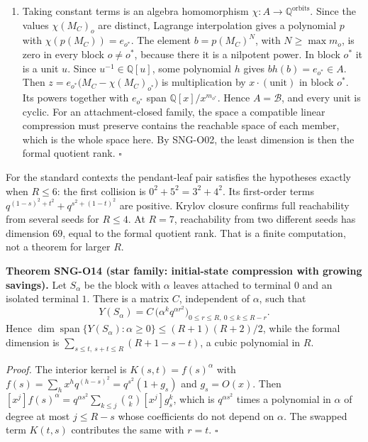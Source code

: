 \documentclass[
  11pt,
  a4paper,
]{report}
\providecommand{\tightlist}{%
  \setlength{\itemsep}{0pt}\setlength{\parskip}{0pt}}
\begin{document}
\begin{enumerate}
\def\labelenumi{(\arabic{enumi})}
\setcounter{enumi}{1}
\tightlist
\item
  Taking constant terms is an algebra homomorphism
  \(\chi:A\to\mathbb Q^{\text{orbits}}\). Since the values
  \(\chi(M_C)_o\) are distinct, Lagrange interpolation gives a
  polynomial \(p\) with \(\chi(p(M_C))=e_{o^*}\). The element
  \(b=p(M_C)^{N}\), with \(N\ge\max m_o\), is zero in every block
  \(o\ne o^*\), because there it is a nilpotent power. In block \(o^*\)
  it is a unit \(u\). Since \(u^{-1}\in\mathbb Q[u]\), some polynomial
  \(h\) gives \(bh(b)=e_{o^*}\in A\). Then
  \(z=e_{o^*}\bigl(M_C-\chi(M_C)_{o^*}\bigr)\) is multiplication by
  \(x\cdot(\text{unit})\) in block \(o^*\). Its powers together with
  \(e_{o^*}\) span \(\mathbb Q[x]/x^{m_{o^*}}\). Hence \(A=\mathcal B\),
  and every unit is cyclic. For an attachment-closed family, the space a
  compatible linear compression must preserve contains the reachable
  space of each member, which is the whole space here. By SNG-O02, the
  least dimension is then the formal quotient rank. \(\square\)
\end{enumerate}

For the standard contexts the pendant-leaf pair satisfies the hypotheses
exactly when \(R\le6\): the first collision is \(0^2+5^2=3^2+4^2\). Its
first-order terms \(q^{(1-s)^2+t^2}+q^{s^2+(1-t)^2}\) are positive.
Krylov closure confirms full reachability from several seeds for
\(R\le4\). At \(R=7\), reachability from two different seeds has
dimension \(69\), equal to the formal quotient rank. That is a finite
computation, not a theorem for larger \(R\).

\textbf{Theorem SNG-O14 (star family: initial-state compression with
growing savings).} Let \(S_\alpha\) be the block with \(\alpha\) leaves
attached to terminal \(0\) and an isolated terminal \(1\). There is a
matrix \(C\), independent of \(\alpha\), such that \[
Y(S_\alpha)=C\,\bigl(\alpha^kq^{\alpha r^2}\bigr)_{0\le r\le R,\ 0\le k\le R-r}.
\] Hence
\(\dim\operatorname{span}\{Y(S_\alpha):\alpha\ge0\}\le(R+1)(R+2)/2\),
while the formal dimension is \(\sum_{s\le t,\ s+t\le R}(R+1-s-t)\), a
cubic polynomial in \(R\).

\emph{Proof.} The interior kernel is \(K(s,t)=f(s)^\alpha\) with
\(f(s)=\sum_hx^hq^{(h-s)^2}=q^{s^2}(1+g_s)\) and \(g_s=O(x)\). Then
\([x^j]f(s)^\alpha=q^{\alpha s^2}\sum_{k\le j}\binom{\alpha}{k}[x^j]g_s^k\),
which is \(q^{\alpha s^2}\) times a polynomial in \(\alpha\) of degree
at most \(j\le R-s\) whose coefficients do not depend on \(\alpha\). The
swapped term \(K(t,s)\) contributes the same with \(r=t\). \(\square\)
\end{document}
